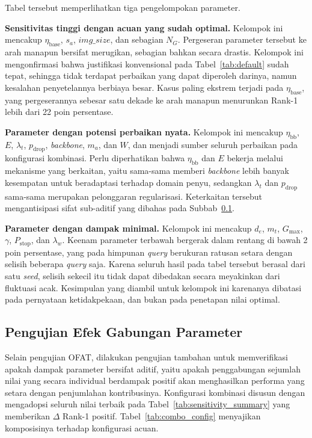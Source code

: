 Tabel tersebut memperlihatkan tiga pengelompokan parameter.

\textbf{Sensitivitas tinggi dengan acuan yang sudah optimal.} Kelompok ini mencakup $\eta_{\text{base}}$, $s_a$, $\mathit{img\_size}$, dan sebagian $N_G$. Pergeseran parameter tersebut ke arah manapun bersifat merugikan, sebagian bahkan secara drastis. Kelompok ini mengonfirmasi bahwa justifikasi konvensional pada Tabel~\ref{tab:default} sudah tepat, sehingga tidak terdapat perbaikan yang dapat diperoleh darinya, namun kesalahan penyetelannya berbiaya besar. Kasus paling ekstrem terjadi pada $\eta_{\text{base}}$, yang pergeserannya sebesar satu dekade ke arah manapun menurunkan Rank-1 lebih dari 22 poin persentase.

\textbf{Parameter dengan potensi perbaikan nyata.} Kelompok ini mencakup $\eta_{\text{bb}}$, $E$, $\lambda_t$, $p_{\text{drop}}$, \textit{backbone}, $m_a$, dan $W$, dan menjadi sumber seluruh perbaikan pada konfigurasi kombinasi. Perlu diperhatikan bahwa $\eta_{\text{bb}}$ dan $E$ bekerja melalui mekanisme yang berkaitan, yaitu sama-sama memberi \textit{backbone} lebih banyak kesempatan untuk beradaptasi terhadap domain penyu, sedangkan $\lambda_t$ dan $p_{\text{drop}}$ sama-sama merupakan pelonggaran regularisasi. Keterkaitan tersebut mengantisipasi sifat sub-aditif yang dibahas pada Subbab~\ref{subsec:aditivitas}.

\textbf{Parameter dengan dampak minimal.} Kelompok ini mencakup $d_e$, $m_t$, $G_{\max}$, $\gamma$, $P_{\text{stop}}$, dan $\lambda_w$. Keenam parameter terbawah bergerak dalam rentang di bawah 2 poin persentase, yang pada himpunan \textit{query} berukuran ratusan setara dengan selisih beberapa \textit{query} saja. Karena seluruh hasil pada tabel tersebut berasal dari satu \textit{seed}, selisih sekecil itu tidak dapat dibedakan secara meyakinkan dari fluktuasi acak. Kesimpulan yang diambil untuk kelompok ini karenanya dibatasi pada pernyataan ketidakpekaan, dan bukan pada penetapan nilai optimal.

\subsection{Pengujian Efek Gabungan Parameter}
\label{subsec:aditivitas}

Selain pengujian OFAT, dilakukan pengujian tambahan untuk memverifikasi apakah dampak parameter bersifat aditif, yaitu apakah penggabungan sejumlah nilai yang secara individual berdampak positif akan menghasilkan performa yang setara dengan penjumlahan kontribusinya. Konfigurasi kombinasi disusun dengan mengadopsi seluruh nilai terbaik pada Tabel~\ref{tab:sensitivity_summary} yang memberikan $\Delta$ Rank-1 positif. Tabel~\ref{tab:combo_config} menyajikan komposisinya terhadap konfigurasi acuan.

